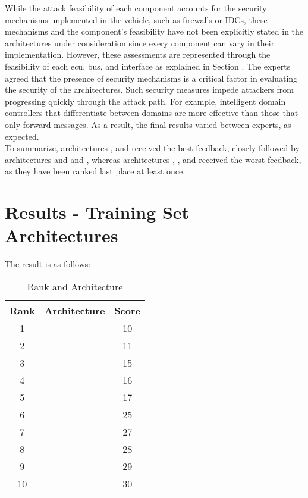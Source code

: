 While the attack feasibility of each component accounts for the security mechanisms implemented in the vehicle, such as firewalls or IDCs, 
these mechanisms and the component's feasibility have not been explicitly stated in the architectures under consideration since every component can vary in their implementation.
However, these assessments are represented through the feasibility of each \acrshort{ecu}, bus, and interface as explained in Section .
The experts agreed that the presence of security mechanisms is a critical factor in evaluating the security of the architectures.
Such security measures impede attackers from progressing quickly through the attack path. 
For example, intelligent domain controllers that differentiate between domains are more effective than those that only forward messages.
As a result, the final results varied between experts, as expected.\\

To summarize, architectures , and  received the best feedback, closely followed by architectures  and  and ,
whereas architectures , , and  received the worst feedback, as they have been ranked last place at least once.

\section{Results - Training Set Architectures}

The result is as follows:

\begin{table}[h]
    \label{table:survey}
    \centering
    \caption{Rank and Architecture}
    \begin{tabular}{ |c|c|c| } 
    \hline
    Rank & Architecture & Score \\
    \hline
    1 & \nameref{fig:architecture3} & 10 \\
    2 & \nameref{fig:architecture8} & 11 \\
    3 & \nameref{fig:architecture6} & 15 \\
    4 & \nameref{fig:architecture10} & 16 \\
    5 & \nameref{fig:architecture2} & 17 \\
    6 & \nameref{fig:architecture1} & 25 \\
    7 & \nameref{fig:architecture5} & 27 \\
    8 & \nameref{fig:architecture7} & 28 \\
    9 & \nameref{fig:architecture9} & 29 \\
    10 & \nameref{fig:architecture4} & 30\\
    \hline
    \end{tabular}
\end{table}
